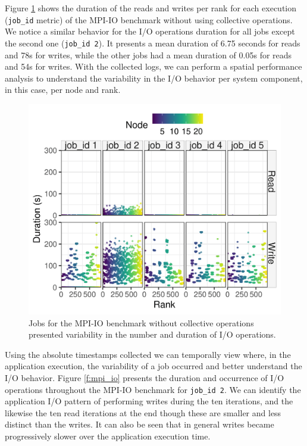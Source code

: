Figure \ref{f:mpi_io_all} shows the duration of the reads and writes
per rank for each execution (\texttt{job\_id} metric) of the MPI-IO
benchmark without using collective operations. We notice a similar
behavior for the I/O operations duration for all jobs except the
second one (\texttt{job\_id 2}). It presents a mean duration of 6.75
seconds for reads and 78s for writes, while the other jobs had a mean
duration of 0.05s for reads and 54s for writes. With the collected
logs, we can perform a spatial performance analysis to understand the
variability in the I/O behavior per system component, in this case,
per node and rank.
      
\begin{figure}
	\centering
        \includegraphics[width=\linewidth]{figs/mpi_io_luster_no_coll_duration_allexperiments.png}
	\caption{Jobs for the MPI-IO benchmark without collective
          operations presented variability in the number and duration
          of I/O operations.}
	\label{f:mpi_io_all}
\end{figure}

Using the absolute timestamps collected we can temporally view
where, in the application execution, the variability of a job
occurred and better understand the I/O behavior. 
Figure \ref{f:mpi_io} presents the duration and occurrence of
I/O operations throughout the MPI-IO benchmark for \texttt{job\_id
  2}. We can identify the application I/O pattern of performing
writes during the ten iterations, and the likewise the ten read iterations at the end
though these are smaller and less distinct than the writes. 
It can also be seen that in general writes became progressively slower over
the application execution time.
      
